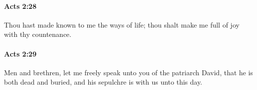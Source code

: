 		\paragraph{Acts 2:28} %
			\label{ACTS-2-28}

			Thou hast made known to me the ways of life; thou shalt make me full of joy with thy countenance.

			\begin{framed}
			\scriptsize
				\begin{compactdesc}
					\item[SBLG] 
				\end{compactdesc}
			\end{framed}

		\paragraph{Acts 2:29} %
			\label{ACTS-2-29}

			Men and brethren, let me freely speak unto you of the patriarch David, that he is both dead and buried, and his sepulchre is with us unto this day.


